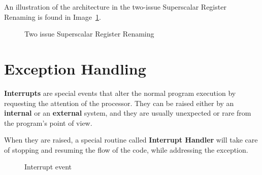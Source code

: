 \documentclass[english]{article}
\begin{document}
An illustration of the architecture in the two-issue Superscalar Register Renaming is found in Image~\ref{fig:two-issue-superscalar-register-renaming}.

\begin{figure}[htbp]
  \bigskip
  \centering
  \caption{Two issue Superscalar Register Renaming}
  \label{fig:two-issue-superscalar-register-renaming}
  \bigskip
\end{figure}

\clearpage

\section{Exception Handling}

\textbf{Interrupts} are special events that alter the normal program execution by requesting the attention of the processor.
They can be raised either by an \textbf{internal} or an \textbf{external} system, and they are usually unexpected or rare from the program's point of view.

When they are raised, a special routine called \textbf{Interrupt Handler} will take care of stopping and resuming the flow of the code, while addressing the exception.

\begin{figure}[htbp]
  \bigskip
  \centering
  \caption{Interrupt event}
  \label{fig:interrupt-event}
  \bigskip
\end{figure}
\end{document}
